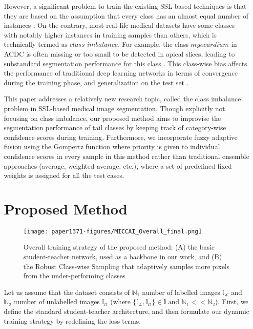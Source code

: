 \documentclass[runningheads]{llncs}
\begin{document}
However, a significant problem to train the existing SSL-based techniques is that they are based on the assumption that every class has an almost equal number of instances \cite{stanescu2014semi}. On the contrary, most real-life medical datasets have some classes with notably higher instances in training samples than others, which is technically termed as $class$ $imbalance$. For example, the class $myocardium$ in ACDC \cite{bernard2018deep} is often missing or too small to be detected in apical slices, leading to substandard segmentation performance for this class \cite{bernard2018deep}.  This class-wise bias affects the performance of traditional deep learning networks in terms of convergence during the training phase, and generalization on the test set \cite{japkowicz2002class}.

This paper addresses a relatively new research topic, called the class imbalance problem in SSL-based medical image segmentation. Though explicitly not focusing on class imbalance, our proposed method aims to improvise the segmentation performance of tail classes by keeping track of category-wise confidence scores during training. Furthermore, we incorporate fuzzy adaptive fusion using the Gompertz function where priority is given to individual confidence scores in every sample in this method rather than traditional ensemble approaches (average, weighted average, etc.), where a set of predefined fixed weights is assigned for all the test cases.






\section{Proposed Method}

\begin{figure}[tbp]
    \centering
    \texttt{[image: paper1371-figures/MICCAI\_Overall\_final.png]}
    \caption{Overall training strategy of the proposed method: (A) the basic student-teacher network, used as a backbone in our work, and (B) the Robust Class-wise Sampling that adaptively samples more pixels from the under-performing classes}
    \label{overall_figure}
\end{figure}

Let us assume that the dataset consists of $\mathbb{N}_1$ number of labelled images $\mathbb{I}_\mathcal{L}$ and $\mathbb{N}_2$ number of unlabelled images $\mathbb{I}_\mathcal{U}$ (where $\{\mathbb{I}_\mathcal{L}, \mathbb{I}_\mathcal{U}\} \in \mathbb{I}$ and $\mathbb{N}_1<<\mathbb{N}_2$). First, we define the standard student-teacher architecture, and then formulate our dynamic training strategy by redefining the loss terms. 
\end{document}
